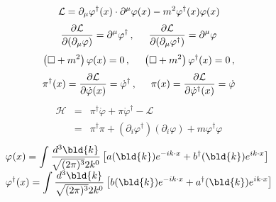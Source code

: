 \begin{equation}
{\cal L} = \partial_\mu \varphi^\dagger(x)\cdot \partial^\mu \varphi(x)
- m^2 \varphi^\dagger(x)\varphi(x)
\label{eqn:cmplscLagdens}
\end{equation}
\begin{equation}
\frac{\partial {\cal L}}{\partial(\partial_\mu \varphi)} = \partial^\mu \varphi^\dagger
\,,
\hspace{5mm}
\frac{\partial {\cal L}}{\partial(\partial_\mu \varphi^\dagger)} = \partial^\mu \varphi
\end{equation}
\begin{equation}
\left( \Box + m^2 \right) \varphi(x) = 0\,,
\hspace{5mm}
\left( \Box + m^2 \right) \varphi^\dagger(x) = 0\,,
\end{equation}
\begin{equation}
\pi^\dagger(x) = \frac{ \partial {\cal L}}{ \partial \dot{\varphi}(x) } = \dot{\varphi}^\dagger
\,,
\hspace{5mm}
\pi(x) = \frac{ \partial {\cal L}}{ \partial \dot{\varphi}^\dagger(x) } = \dot{\varphi}
\end{equation}
\begin{eqnarray}
\mathcal{H} 
&=&
\pi^\dagger \dot{\varphi} + \pi \dot{\varphi}^\dagger - \mathcal{L}
\nonumber\\
&=&
\pi^\dagger \pi + (\partial_i \varphi^\dagger) (\partial_i \varphi) + m \varphi^\dagger \varphi
\end{eqnarray}
\begin{equation}
\begin{array}{l}
\displaystyle
\varphi_{}(x) = \int \frac{d^3 \bld{k}}{\sqrt{(2\pi)^3}2k^0} \left[
a(\bld{k}) e^{-i k \cdot x} + b^\dagger(\bld{k})e^{i k \cdot x} \right]
\\
\displaystyle
\varphi^\dagger_{}(x) = \int \frac{d^3 \bld{k}}{\sqrt{(2\pi)^3}2k^0} \left[
b(\bld{k})e^{- i k \cdot x}  + a^\dagger (\bld{k}) e^{i k \cdot x} \right]
\end{array}
\label{eqn:CompScFourier}
\end{equation}
